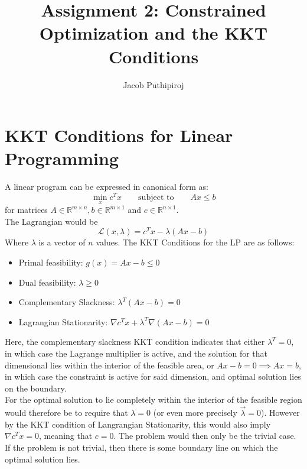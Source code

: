 \documentclass{article}
\begin{document}
\title{Assignment 2: Constrained Optimization and the KKT Conditions}
\author{Jacob Puthipiroj}
\maketitle

\section*{KKT Conditions for Linear Programming}


A linear program can be expressed in canonical form as:
$$ \min_x c^Tx \qquad \text{subject to} \qquad Ax \leq b$$
for matrices $A \in \mathbb{R}^{m \times n}, b \in \mathbb{R}^{m \times 1}$ and $c \in \mathbb{R}^{n \times 1}$.\\


The Lagrangian would be $$ \mathcal{L}(x,\lambda) = c^Tx - \lambda(Ax-b) $$
Where $\lambda$ is a vector of $n$ values.  The KKT Conditions for the LP are as follows:

\begin{itemize} 
\itemsep0em 
\item Primal feasibility: $g(x) = Ax - b \leq 0 $
\item Dual feasibility: $\lambda \geq 0$
\item Complementary Slackness: $\lambda^T (Ax - b) = 0$
\item Lagrangian Stationarity: $\nabla c^Tx + \lambda^T \nabla (Ax - b) = 0$

\end{itemize} 

Here, the complementary slackness KKT condition indicates that either $\lambda^T = 0$, in which case the Lagrange multiplier is active, and the solution for that dimensional lies within the interior of the feasible area, or  $Ax - b = 0 \implies Ax = b$, in which case the constraint is active for said dimension, and optimal solution lies on the boundary. \\

For the optimal solution to lie completely within the interior of the feasible region would therefore be to require that $\lambda = 0 $ (or even more precisely $\vec{\lambda} = 0$). However by the KKT condition of Langrangian Stationarity, this would also imply $\nabla c^Tx = 0$, meaning that $c = 0$. The problem would then only be the trivial case. If the problem is not trivial, then there is some boundary line on which the optimal solution lies.  
\end{document}
